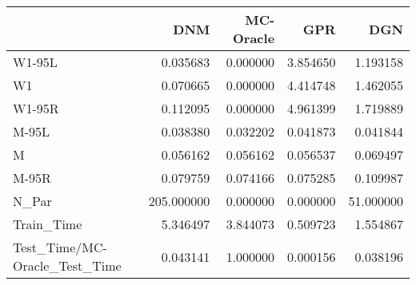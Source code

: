 \begin{tabular}{lrrrr}
\toprule
{} &         DNM &  MC-Oracle &       GPR &        DGN \\
\midrule
W1-95L                        &    0.035683 &   0.000000 &  3.854650 &   1.193158 \\
W1                            &    0.070665 &   0.000000 &  4.414748 &   1.462055 \\
W1-95R                        &    0.112095 &   0.000000 &  4.961399 &   1.719889 \\
M-95L                         &    0.038380 &   0.032202 &  0.041873 &   0.041844 \\
M                             &    0.056162 &   0.056162 &  0.056537 &   0.069497 \\
M-95R                         &    0.079759 &   0.074166 &  0.075285 &   0.109987 \\
N\_Par                         &  205.000000 &   0.000000 &  0.000000 &  51.000000 \\
Train\_Time                    &    5.346497 &   3.844073 &  0.509723 &   1.554867 \\
Test\_Time/MC-Oracle\_Test\_Time &    0.043141 &   1.000000 &  0.000156 &   0.038196 \\
\bottomrule
\end{tabular}
